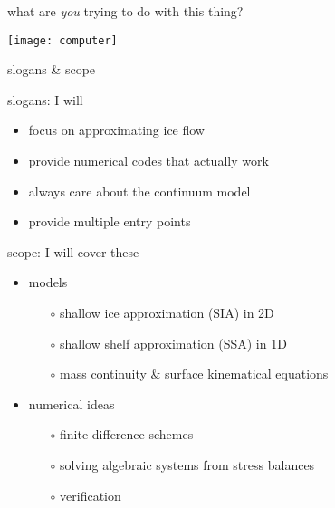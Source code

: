 


\begin{frame}{what are \emph{you} trying to do with this thing?}

\begin{center}
\texttt{[image: computer]}
\end{center}
\end{frame}


\begin{frame}{slogans \& scope}

slogans: I will
  \begin{itemize}
  \item \alert{focus on approximating ice flow}
  \item \alert{provide numerical codes that actually work}
  \item \alert{always care about the continuum model}
  \item \alert{provide multiple entry points}
  \end{itemize}
\medskip

scope: I will cover these
  \begin{itemize}
  \item models

    \begin{itemize}
    \item[$\circ$] shallow ice approximation (SIA) in 2D
    \item[$\circ$] shallow shelf approximation (SSA) in 1D
    \item[$\circ$] mass continuity \& surface kinematical equations
    \end{itemize}

  \item numerical ideas

    \begin{itemize}
    \item[$\circ$] finite difference schemes
    \item[$\circ$] solving algebraic systems from stress balances
    \item[$\circ$] verification
    \end{itemize}
  \end{itemize}
\end{frame}


